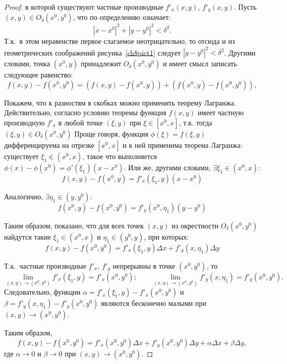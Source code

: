 \begin{proof}
 в которой существуют частные производные $f'_x(x,y)$, $f'_y(x,y)$. Пусть $(x,y) \in O_\delta(x^0, y^0)$, что по определению означает:
$$
|x - x^0|^2 + |y - y^0|^2 < \delta^2.
$$ 
Т.к.~в этом неравенстве первое слагаемое неотрицательно, то отсюда и из геометрических соображений рисунка~\ref{ch8pict1} следует $|y - y^0|^2 < \delta^2$. Другими словами, точка $(x^0, y)$ принадлежит $O_\delta(x^0, y^0)$ и имеет смысл записать следующее равенство:
\begin{equation*}
f(x,y) - f(x^0, y^0) = (f(x,y) - f(x^0, y)) + (f(x^0, y) - f(x^0, y^0)),
\end{equation*}

Покажем, что к разностям в скобках можно применить теорему Лагранжа. Действительно, согласно условию теоремы функция $f(x, y)$ имеет частную производную $f'_x$ в любой точке $(\xi, y)$  при $\xi \in [x^0, x]$, т.к. тогда $(\xi, y) \in O_\delta(x^0, y^0)$ Проще говоря, функция $\phi(\xi)=f(\xi, y)$ дифференцируема на отрезке $[x^0, x]$ и к ней применима теорема Лагранжа: существует $\xi_1 \in (x^0, x)$, такое что выполняется $\phi(x) - \phi(x^0) = \phi'(\xi_1)(x - x^0)$. Или же, другими словами, $\exists \xi_1 \in (x^0, x)$:
$$
f(x,y) - f(x^0, y) = f'_x(\xi_1, y)(x - x^0)
$$

Аналогично, $\exists \eta_1 \in (y, y^0)$:
$$
f(x^0, y) - f(x^0, y^0) = f'_y(x^0, \eta_1)(y - y^0)
$$ 

Таким образом, показано, что для всех точек $(x,y)$ из окрестности $O_\delta(x^0, y^0)$ найдутся такие $\xi_1 \in (x^0, x)$ и $\eta_1 \in (y^0, y)$, при которых:
$$
f(x,y) - f(x^0, y^0) = f'_x(\xi_1, y) \Delta x + f'_y(x, \eta_1) \Delta y
$$

Т.к.~частные производные $f'_x$, $f'_y$ непрерывны в точке $(x^0, y^0)$, то 
$$
\lim\limits_{(x,y) \to (x^0, y^0)} f'_x(\xi_1, y) = f'_x(x^0, y^0);\qquad 
\lim\limits_{(x,y) \to (x^0, y^0)} f'_y(x, \eta_1) = f'_y(x^0, y^0).
$$
Следовательно, функции $\alpha =  f'_x(\xi_1, y) - f'_x(x^0, y^0)$ и $\beta =  f'_y(x, \eta_1) - f'_y(x^0, y^0)$ являются бесконечно малыми при $(x,y) \to (x^0, y^0)$. 

Таким образом,
$$
f(x,y) - f(x^0, y^0) = f'_x(x^0, y^0) \Delta x + f'_y(x^0, y^0) \Delta y + \alpha \Delta x + \beta \Delta y,
$$
где $\alpha \to 0$ и $\beta \to 0$ при $(x,y)\to(x^0,y^0)$.


\end{proof}
